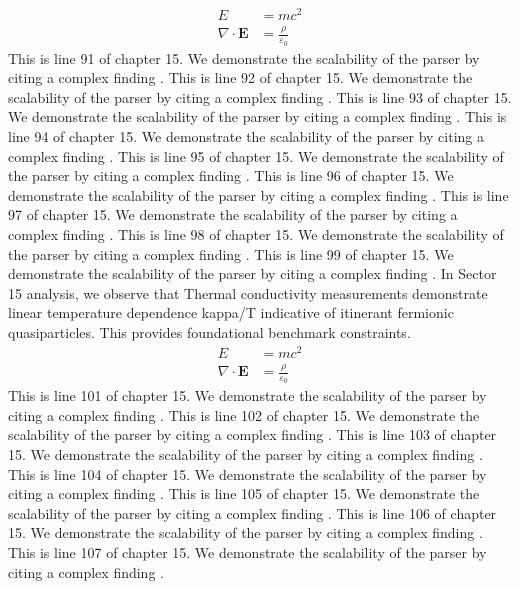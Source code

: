 \begin{align*}
  E &= mc^2 \\
  \nabla \cdot \mathbf{E} &= \frac{\rho}{\varepsilon_0}
\end{align*}
This is line 91 of chapter 15. We demonstrate the scalability of the parser by citing a complex finding \cite{ref15_91}.
This is line 92 of chapter 15. We demonstrate the scalability of the parser by citing a complex finding \cite{ref15_92}.
This is line 93 of chapter 15. We demonstrate the scalability of the parser by citing a complex finding \cite{ref15_93}.
This is line 94 of chapter 15. We demonstrate the scalability of the parser by citing a complex finding \cite{ref15_94}.
This is line 95 of chapter 15. We demonstrate the scalability of the parser by citing a complex finding \cite{ref15_95}.
This is line 96 of chapter 15. We demonstrate the scalability of the parser by citing a complex finding \cite{ref15_96}.
This is line 97 of chapter 15. We demonstrate the scalability of the parser by citing a complex finding \cite{ref15_97}.
This is line 98 of chapter 15. We demonstrate the scalability of the parser by citing a complex finding \cite{ref15_98}.
This is line 99 of chapter 15. We demonstrate the scalability of the parser by citing a complex finding \cite{ref15_99}.
In Sector 15 analysis, we observe that Thermal conductivity measurements demonstrate linear temperature dependence kappa/T indicative of itinerant fermionic quasiparticles. This provides foundational benchmark constraints.
\begin{align*}
  E &= mc^2 \\
  \nabla \cdot \mathbf{E} &= \frac{\rho}{\varepsilon_0}
\end{align*}
This is line 101 of chapter 15. We demonstrate the scalability of the parser by citing a complex finding \cite{ref15_101}.
This is line 102 of chapter 15. We demonstrate the scalability of the parser by citing a complex finding \cite{ref15_102}.
This is line 103 of chapter 15. We demonstrate the scalability of the parser by citing a complex finding \cite{ref15_103}.
This is line 104 of chapter 15. We demonstrate the scalability of the parser by citing a complex finding \cite{ref15_104}.
This is line 105 of chapter 15. We demonstrate the scalability of the parser by citing a complex finding \cite{ref15_105}.
This is line 106 of chapter 15. We demonstrate the scalability of the parser by citing a complex finding \cite{ref15_106}.
This is line 107 of chapter 15. We demonstrate the scalability of the parser by citing a complex finding \cite{ref15_107}.
